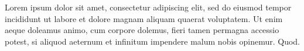\documentclass{article}
\begin{document}
Lorem ipsum dolor sit amet, consectetur adipiscing elit, sed do eiusmod tempor incididunt ut labore et dolore magnam aliquam quaerat voluptatem. Ut enim aeque doleamus animo, cum corpore dolemus, fieri tamen permagna accessio potest, si aliquod aeternum et infinitum impendere malum nobis opinemur. Quod.
\end{document}

